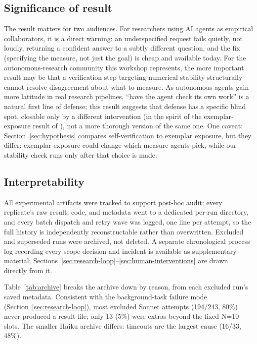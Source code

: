 \documentclass{article}
\begin{document}
\subsection{Significance of result}

The result matters for two audiences. For researchers using AI agents as empirical
collaborators, it is a direct warning: an underspecified request fails quietly, not
loudly, returning a confident answer to a subtly different question, and the fix
(specifying the measure, not just the goal) is cheap and available today. For the autonomous-research community this workshop represents, the more
important result may be that a verification step targeting numerical stability structurally
cannot resolve disagreement about what to measure. As autonomous agents gain more latitude
in real research pipelines, ``have the agent check its own work'' is a natural first line
of defense; this result suggests that defense has a specific blind spot, closable only by a
different intervention (in the spirit of the exemplar-exposure result of
\citet{gaoxiao2026}), not a more thorough version of the same one. One caveat:
Section~\ref{sec:hypothesis} compares self-verification to exemplar exposure, but they differ: exemplar
exposure could change which measure agents pick, while our stability check runs only after
that choice is made.

\subsection{Interpretability}

All experimental artifacts were tracked to support post-hoc audit: every replicate's raw
result, code, and metadata went to a dedicated per-run directory, and every batch dispatch
and retry wave was logged, one line per attempt, so the full history is independently
reconstructable rather than overwritten. Excluded and superseded runs were archived, not
deleted. A separate chronological process log
recording every scope decision and incident is available as supplementary material;
Sections~\ref{sec:research-loop}--\ref{sec:human-interventions} are drawn directly from it.

Table~\ref{tab:archive} breaks the archive down by reason, from each excluded run's saved
metadata. Consistent with the background-task failure mode (Section~\ref{sec:research-loop}),
most excluded Sonnet attempts (194/243, 80\%) never produced a result file; only 13 (5\%)
were extras beyond the fixed N=10 slots. The smaller Haiku archive differs: timeouts are
the largest cause (16/33, 48\%).
\end{document}
